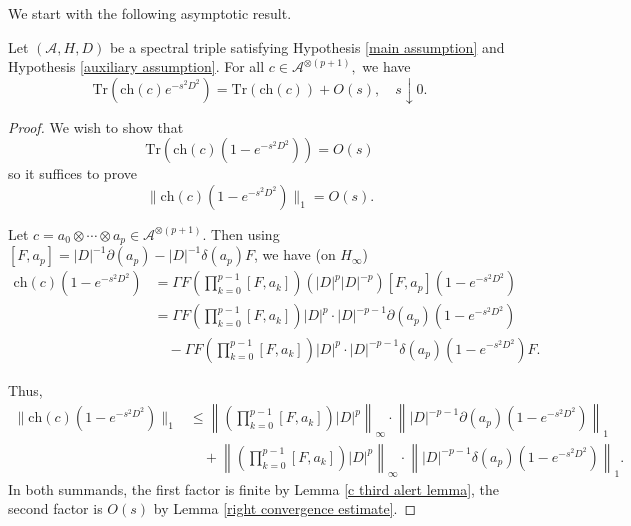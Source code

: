     We start with the following asymptotic result.
    \begin{lem}\label{initial convergence theorem} 
        Let $(\mathcal{A},H,D)$ be a spectral triple satisfying Hypothesis \ref{main assumption} and Hypothesis \ref{auxiliary assumption}. For all $c\in\mathcal{A}^{\otimes (p+1)},$ we have
        \begin{equation*}
            \mathrm{Tr}(\mathrm{ch}(c)e^{-s^2D^2}) = \mathrm{Tr}(\mathrm{ch}(c)) + O(s),\quad s\downarrow0.
        \end{equation*}
    \end{lem}
    \begin{proof} 
        We wish to show that
        \begin{equation*}
            \mathrm{Tr}(\mathrm{ch}(c)(1-e^{-s^2D^2})) = O(s)
        \end{equation*}
        so it suffices to prove
        \begin{equation*}
            \|\mathrm{ch}(c)(1-e^{-s^2D^2})\|_1 = O(s).
        \end{equation*}
        
        Let $c = a_0\otimes\cdots \otimes a_p \in \mathcal{A}^{\otimes (p+1)}$. Then using $[F,a_p] = |D|^{-1}\partial(a_p)-|D|^{-1}\delta(a_p)F$, we have (on $H_\infty$)
        \begin{align*}
            \mathrm{ch}(c)(1-e^{-s^2D^2}) &= \Gamma F \left(\prod_{k=0}^{p-1}[F,a_k]\right)(|D|^p|D|^{-p})[F,a_p](1-e^{-s^2D^2})\\
                                  &= \Gamma F \left(\prod_{k=0}^{p-1}[F,a_k]\right)|D|^p\cdot |D|^{-p-1}\partial(a_p)(1-e^{-s^2D^2})\\
                                  &\quad-\Gamma F \left(\prod_{k=0}^{p-1}[F,a_k]\right)|D|^p\cdot |D|^{-p-1}\delta(a_p)(1-e^{-s^2D^2})F.
        \end{align*}
        
        Thus,
        \begin{align*}
                 \|\mathrm{ch}(c)(1-e^{-s^2D^2})\|_1 &\leq  \left\|\left(\prod_{k=0}^{p-1}[F,a_k]\right)|D|^p\right\|_{\infty}\cdot\left\||D|^{-p-1}\partial(a_p)(1-e^{-s^2D^2})\right\|_1\\
                                             &\quad+\left\|\left(\prod_{k=0}^{p-1}[F,a_k]\right)|D|^p\right\|_{\infty}\cdot\left\||D|^{-p-1}\delta(a_p)(1-e^{-s^2D^2})\right\|_1.
        \end{align*}
        In both summands, the first factor is finite by Lemma \ref{c third alert lemma}, the second factor is $O(s)$ by Lemma \ref{right convergence estimate}.
    \end{proof}


